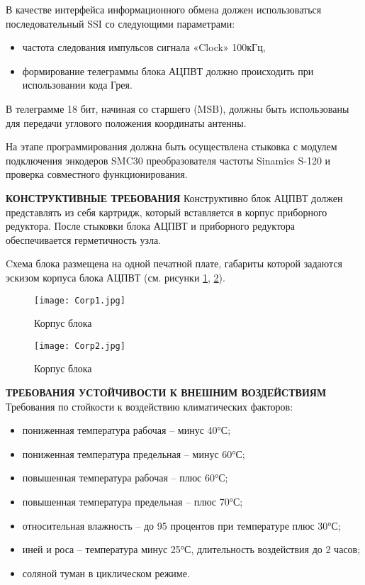     В качестве интерфейса информационного обмена должен использоваться последовательный SSI со следующими параметрами:
    \begin{itemize}
          \item частота следования импульсов сигнала «Clock» 100кГц,
          \item  формирование телеграммы блока АЦПВТ должно происходить при использовании кода Грея. 
    \end{itemize}
    В телеграмме 18 бит, начиная со старшего (MSB), должны быть использованы для передачи углового положения координаты антенны. 

    На этапе программирования должна быть осуществлена стыковка с модулем подключения энкодеров SMC30 преобразователя частоты Sinamics S-120 и проверка совместного функционирования. 

\textbf{КОНСТРУКТИВНЫЕ ТРЕБОВАНИЯ}
        Конструктивно блок АЦПВТ должен представлять из себя картридж, который вставляется в корпус приборного редуктора. 
        После стыковки блока АЦПВТ и приборного редуктора обеспечивается герметичность узла. 

        Cхема блока размещена на одной печатной плате, габариты которой задаются эскизом корпуса блока АЦПВТ (см. рисунки \ref{Corp1}, \ref{Corp2}). 

        \begin{figure}[!t]
          \centering
          \texttt{[image: Corp1.jpg]} 
          \caption{Корпус блока}
          \label{Corp1}
        \end{figure}

        \begin{figure}[!t]
          \centering
          \texttt{[image: Corp2.jpg]} 
          \caption{Корпус блока}
          \label{Corp2}
        \end{figure}

  \textbf{ТРЕБОВАНИЯ УСТОЙЧИВОСТИ К ВНЕШНИМ ВОЗДЕЙСТВИЯМ}
  Требования по стойкости к воздействию климатических факторов:
\begin{itemize}

  \item пониженная температура рабочая – минус 40°С;

  \item пониженная температура предельная – минус 60°С;

 \item повышенная температура рабочая – плюс 60°С;

 \item повышенная температура предельная – плюс 70°С;

 \item относительная влажность – до 95 процентов при температуре плюс 30°С;

 \item иней и роса – температура минус 25°С, длительность воздействия до 2 часов;

 \item соляной туман в циклическом режиме.

\end{itemize}


